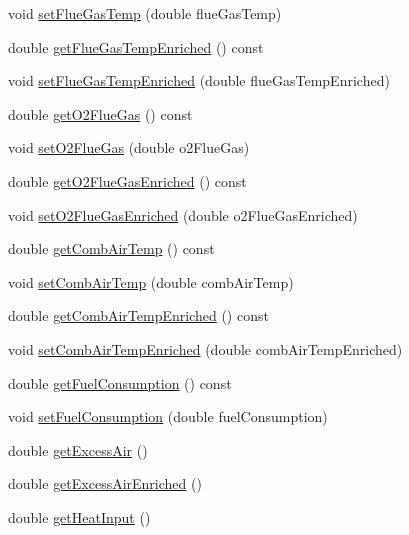 \begin{DoxyCompactItemize}
\item 
void \hyperlink{class_o2_enrichment_a37e625de13b171a6db256a108455aab9}{set\+Flue\+Gas\+Temp} (double flue\+Gas\+Temp)
\item 
double \hyperlink{class_o2_enrichment_ab69ee84a1b662e4c1f9a49d23acc6f00}{get\+Flue\+Gas\+Temp\+Enriched} () const
\item 
void \hyperlink{class_o2_enrichment_a787af9e47a73f2416d6c5d23aaf6d659}{set\+Flue\+Gas\+Temp\+Enriched} (double flue\+Gas\+Temp\+Enriched)
\item 
double \hyperlink{class_o2_enrichment_a1d31e1aef5f5a92f38c9a07216d0e539}{get\+O2\+Flue\+Gas} () const
\item 
void \hyperlink{class_o2_enrichment_aef67aa13531717c0d1832921ce6d27ae}{set\+O2\+Flue\+Gas} (double o2\+Flue\+Gas)
\item 
double \hyperlink{class_o2_enrichment_a274eddb78560dd502a3c5947ac7e6b96}{get\+O2\+Flue\+Gas\+Enriched} () const
\item 
void \hyperlink{class_o2_enrichment_a9866f25fe54e561579079ee1a3889c2d}{set\+O2\+Flue\+Gas\+Enriched} (double o2\+Flue\+Gas\+Enriched)
\item 
double \hyperlink{class_o2_enrichment_ad3e6bab8c49a1ae5232330fc0e1a537a}{get\+Comb\+Air\+Temp} () const
\item 
void \hyperlink{class_o2_enrichment_a70636d71deb4db00ddf761b0dffa3f36}{set\+Comb\+Air\+Temp} (double comb\+Air\+Temp)
\item 
double \hyperlink{class_o2_enrichment_ad628ffe961a2733c60e5008fd044eabe}{get\+Comb\+Air\+Temp\+Enriched} () const
\item 
void \hyperlink{class_o2_enrichment_af245c75ea525a0f5955686b360b54dbb}{set\+Comb\+Air\+Temp\+Enriched} (double comb\+Air\+Temp\+Enriched)
\item 
double \hyperlink{class_o2_enrichment_a48d73aca893ac689880b1d10faa399a5}{get\+Fuel\+Consumption} () const
\item 
void \hyperlink{class_o2_enrichment_ae2b7ed0ecf7b71b2a68f488c7760efaf}{set\+Fuel\+Consumption} (double fuel\+Consumption)
\item 
double \hyperlink{class_o2_enrichment_aba7923d4967cc1258ad6d078822f699a}{get\+Excess\+Air} ()
\item 
double \hyperlink{class_o2_enrichment_ad6e95234bd10eafb98a741e1bd75be58}{get\+Excess\+Air\+Enriched} ()
\item 
double \hyperlink{class_o2_enrichment_a3a9fb23728ab5831e47cb5aafb438439}{get\+Heat\+Input} ()
\item 

\end{DoxyCompactItemize}
